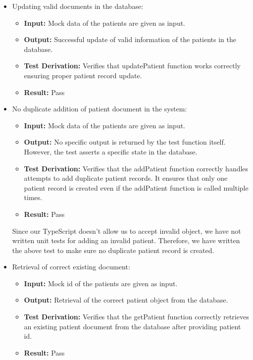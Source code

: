\documentclass[12pt, titlepage]{article}
\begin{document}
\begin{enumerate}
\begin{itemize}
    \item Updating valid documents in the database:

    \begin{itemize}
      \item \textbf{Input:} Mock data of the patients are given as input.  
      \item \textbf{Output:} Successful update of valid information of the patients in the database. 
      \item \textbf{Test Derivation:} Verifies that updatePatient function works correctly ensuring proper patient record update.
      \item \textbf{Result:} Pass
    \end{itemize}

    \item No duplicate addition of patient document in the system:

    \begin{itemize}
      \item \textbf{Input:} Mock data of the patients are given as input.  
      \item \textbf{Output:} No specific output is returned by the test function itself. However, the test asserts a specific state in the database. 
      \item \textbf{Test Derivation:} Verifies that the addPatient function correctly handles attempts to add duplicate patient records. It ensures that only one patient record is created even if the addPatient function is called multiple times.
      \item \textbf{Result:} Pass
    \end{itemize}

    Since our TypeScript doesn't allow us to accept invalid object, we have not written unit tests for adding an invalid patient. Therefore, we have written the above test to make sure no duplicate patient record is created.

    \item Retrieval of correct existing document:

    \begin{itemize}
      \item \textbf{Input:} Mock id of the patients are given as input.  
      \item \textbf{Output:} Retrieval of the correct patient object from the database. 
      \item \textbf{Test Derivation:} Verifies that the getPatient function correctly retrieves an existing patient document from the database after providing patient id.
      \item \textbf{Result:} Pass
    \end{itemize}


\end{itemize}
\end{enumerate}
\end{document}
